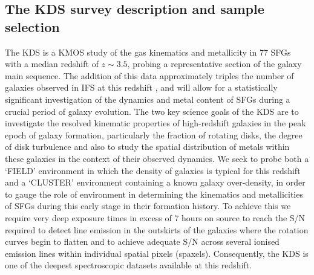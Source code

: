 \documentclass[fleqn,usenatbib]{mn2e}
\begin{document}
\subsection{The KDS survey description and sample selection}\label{subsec:survey_intro}
The KDS is a KMOS study of the gas kinematics and metallicity in 77 SFGs with a median redshift of $z\sim3.5$, probing a representative section of the galaxy main sequence.
The addition of this data approximately triples the number of galaxies observed in IFS at this redshift \citep{Cresci2010,Lemoine-Busserolle2010,Gnerucci2011}, and will allow for a statistically significant investigation of the dynamics and metal content of SFGs during a crucial period of galaxy evolution. 
The two key science goals of the KDS are to investigate the resolved kinematic properties of high-redshift galaxies in the peak epoch of galaxy formation, particularly the fraction of rotating disks, the degree of disk turbulence and also to study the spatial distribution of metals within these galaxies in the context of their observed dynamics.
We seek to probe both a `FIELD' environment in which the density of galaxies is typical for this redshift and a `CLUSTER' environment containing a known galaxy over-density, in order to gauge the role of environment in determining the kinematics and metallicities of SFGs during this early stage in their formation history.
To achieve this we require very deep exposure times in excess of 7 hours on source to reach the S/N required to detect line emission in the outskirts of the galaxies where the rotation curves begin to flatten and to achieve adequate S/N across several ionised emission lines within individual spatial pixels (spaxels).
Consequently, the KDS is one of the deepest spectroscopic datasets available at this redshift. 
\end{document}
